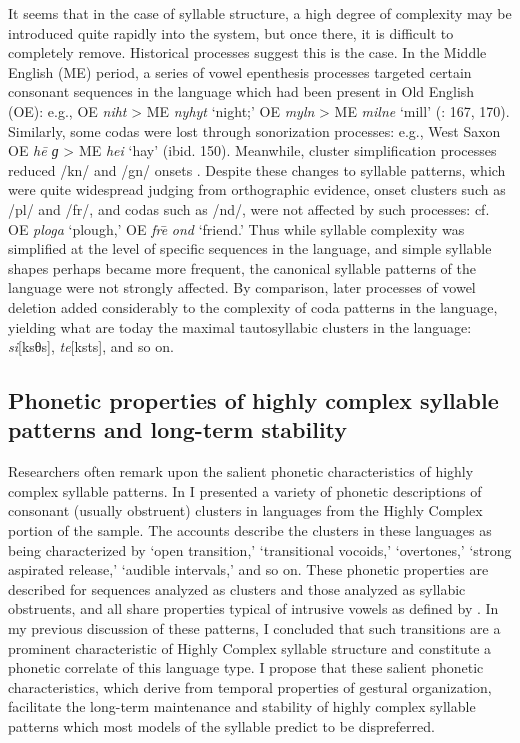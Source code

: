   It seems that in the case of syllable structure, a high degree of complexity may be introduced quite rapidly into the system, but once there, it is difficult to completely remove. Historical processes suggest this is the case. In the Middle English (ME) period, a series of vowel epenthesis processes targeted certain consonant sequences in the language which had been present in Old English (OE): e.g., OE \textit{niht} > ME \textit{nyhyt} ‘night;’ OE \textit{myln} > ME \textit{milne} ‘mill’ (\citealt{Jones1989}: 167, 170). Similarly, some codas were lost through sonorization processes: e.g., West Saxon OE \textit{he\={} ɡ} > ME \textit{hei} ‘hay’ (ibid. 150). Meanwhile, cluster simplification processes reduced /kn/ and /gn/ onsets \citep{Minkova2003}. Despite these changes to syllable patterns, which were quite widespread judging from orthographic evidence, onset clusters such as /pl/ and /fr/, and codas such as /nd/, were not affected by such processes: cf. OE \textit{ploga} ‘plough,’ OE \textit{fre}\textsf{\={} }\textit{ond} ‘friend.’ Thus while syllable complexity was simplified at the level of specific sequences in the language, and simple syllable shapes perhaps became more frequent, the canonical syllable patterns of the language were not strongly affected. By comparison, later processes of vowel deletion added considerably to the complexity of coda patterns in the language, yielding what are today the maximal tautosyllabic clusters in the language: \textit{si}[ksθs], \textit{te}[ksts], and so on.

\subsection{Phonetic properties of highly complex syllable patterns and long-term stability}\label{sec:8.5.3}

  Researchers often remark upon the salient phonetic characteristics of highly complex syllable patterns. In  I presented a variety of phonetic descriptions of consonant (usually obstruent) clusters in languages from the Highly Complex portion of the sample. The accounts describe the clusters in these languages as being characterized by ‘open transition,’ ‘transitional vocoids,’ ‘overtones,’ ‘strong aspirated release,’ ‘audible intervals,’ and so on. These phonetic properties are described for sequences analyzed as clusters and those analyzed as syllabic obstruents, and all share properties typical of intrusive vowels as defined by \citet{Hall2006}. In my previous discussion of these patterns, I concluded that such transitions are a prominent characteristic of Highly Complex syllable structure and constitute a phonetic correlate of this language type. I propose that these salient phonetic characteristics, which derive from temporal properties of gestural organization, facilitate the long-term maintenance and stability of highly complex syllable patterns which most models of the syllable predict to be dispreferred.

